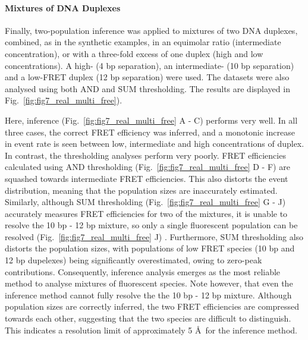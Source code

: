 \paragraph*{Mixtures of DNA Duplexes}
Finally, two-population inference was applied to mixtures of two DNA duplexes, combined, as in the synthetic examples, in an equimolar ratio (intermediate concentration), or with a three-fold excess of one duplex (high and low concentrations). A high- (4 bp separation), an intermediate- (10 bp separation) and a low-FRET duplex (12 bp separation) were used. The datasets were also analysed using both AND and SUM thresholding. The results are displayed in Fig.~\ref{fig:fig7_real_multi_free}). 

Here, inference (Fig.~\ref{fig:fig7_real_multi_free} A - C) performs very well. In all three cases, the correct FRET efficiency was inferred, and a monotonic increase in event rate is seen between low, intermediate and high concentrations of duplex. In contrast, the thresholding analyses perform very poorly. FRET efficiencies calculated using AND thresholding (Fig.~\ref{fig:fig7_real_multi_free} D - F) are squashed towards intermediate FRET efficiencies. This also distorts the event distribution, meaning that the population sizes are inaccurately estimated. Similarly, although SUM thresholding (Fig.~\ref{fig:fig7_real_multi_free} G - J) accurately measures FRET efficiencies for two of the mixtures, it is unable to resolve the 10 bp - 12 bp mixture, so only a single fluorescent population can be resolved (Fig.~\ref{fig:fig7_real_multi_free} J) . Furthermore, SUM thresholding also distorts the population sizes, with populations of low FRET species (10 bp and 12 bp dupelexes) being significantly overestimated, owing to zero-peak contributions. Consequently, inference analysis emerges as the most reliable method to analyse mixtures of fluorescent species. Note however, that even the inference method cannot fully resolve the the 10 bp - 12 bp mixture. Although population sizes are correctly inferred, the two FRET efficiencies are compressed towards each other, suggesting that the two species are difficult to distinguish. This indicates a resolution limit of approximately 5 \AA~for the inference method.    

